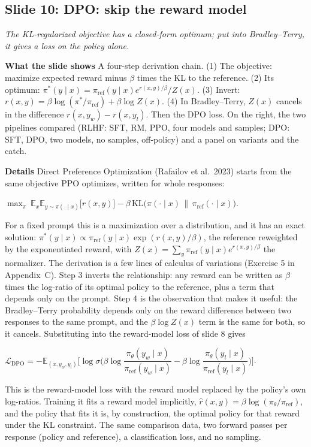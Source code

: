 \documentclass[11pt,letterpaper]{article}
\newcommand{\slide}[3]{%
  \subsection[Slide #1: #2]{Slide #1: #2}%
  {\color{muted}\itshape #3\par}\medskip}
\newcommand{\para}[1]{\medskip\noindent\textbf{#1}\quad}
\newenvironment{formulas}{\begin{tcolorbox}[formulabox]}{\end{tcolorbox}}
\newcommand{\piref}{\pi_{\mathrm{ref}}}
\newcommand{\pit}{\pi_\theta}\newcommand{\KL}{\mathrm{KL}}
\begin{document}
\slide{10}{DPO: skip the reward model}{The KL-regularized objective has a closed-form optimum; put into Bradley--Terry, it gives a loss on the policy alone.}

\para{What the slide shows} A four-step derivation chain. (1) The objective: maximize expected reward minus $\beta$ times the KL to the reference. (2) Its optimum: $\pi^*(y\mid x)=\piref(y\mid x)e^{r(x,y)/\beta}/Z(x)$. (3) Invert: $r(x,y)=\beta\log(\pi^*/\piref)+\beta\log Z(x)$. (4) In Bradley--Terry, $Z(x)$ cancels in the difference $r(x,y_w)-r(x,y_l)$. Then the DPO loss. On the right, the two pipelines compared (RLHF: SFT, RM, PPO, four models and samples; DPO: SFT, DPO, two models, no samples, off-policy) and a panel on variants and the catch.

\para{Details} Direct Preference Optimization (Rafailov et al.\ 2023) starts from the same objective PPO optimizes, written for whole responses:
\begin{formulas}
$\max_\pi\ \mathbb{E}_{x}\mathbb{E}_{y\sim\pi(\cdot\mid x)}\big[r(x,y)\big]-\beta\,\KL\big(\pi(\cdot\mid x)\,\|\,\piref(\cdot\mid x)\big)$.
\end{formulas}
For a fixed prompt this is a maximization over a distribution, and it has an exact solution: $\pi^*(y\mid x)\propto\piref(y\mid x)\exp(r(x,y)/\beta)$, the reference reweighted by the exponentiated reward, with $Z(x)=\sum_y\piref(y\mid x)e^{r(x,y)/\beta}$ the normalizer. The derivation is a few lines of calculus of variations (Exercise 5 in Appendix~C). Step 3 inverts the relationship: any reward can be written as $\beta$ times the log-ratio of its optimal policy to the reference, plus a term that depends only on the prompt. Step 4 is the observation that makes it useful: the Bradley--Terry probability depends only on the reward difference between two responses to the same prompt, and the $\beta\log Z(x)$ term is the same for both, so it cancels. Substituting into the reward-model loss of slide 8 gives
\begin{formulas}
$\mathcal{L}_{\text{DPO}}=-\mathbb{E}_{(x,y_w,y_l)}\Big[\log\sigma\Big(\beta\log\dfrac{\pit(y_w\mid x)}{\piref(y_w\mid x)}-\beta\log\dfrac{\pit(y_l\mid x)}{\piref(y_l\mid x)}\Big)\Big]$.
\end{formulas}
This is the reward-model loss with the reward model replaced by the policy's own log-ratios. Training it fits a reward model implicitly, $\hat r(x,y)=\beta\log(\pit/\piref)$, and the policy that fits it is, by construction, the optimal policy for that reward under the KL constraint. The same comparison data, two forward passes per response (policy and reference), a classification loss, and no sampling.
\end{document}
